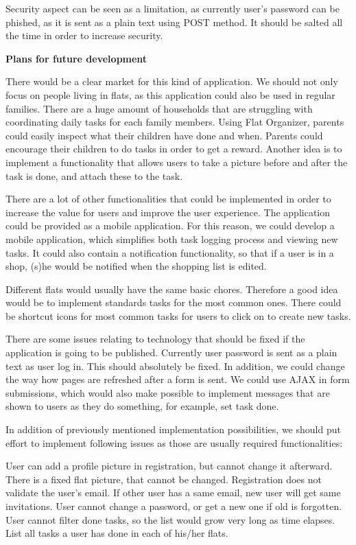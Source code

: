 \documentclass{sig-alt-release2}
\begin{document}
Security aspect can be seen as a limitation, as currently user's password can be
phished, as it is sent as a plain text using POST method. It should be salted
all the time in order to increase security.

\vspace{5 mm} \noindent \textbf{Plans for future development}

There would be a clear market for this kind of application. We should not only
focus on people living in flats, as this application could also be used in
regular families. There are a huge amount of households that are struggling with
coordinating daily tasks for each family members. Using Flat Organizer, parents
could easily inspect what their children have done and when. Parents could
encourage their children to do tasks in order to get a reward. Another idea is
to implement a functionality that allows users to take a picture before and
after the task is done, and attach these to the task.

There are a lot of other functionalities that could be implemented in order to
increase the value for users and improve the user experience. The application
could be provided as a mobile application. For this reason, we could
develop a mobile application, which simplifies both task logging process and
viewing new tasks. It could also contain a notification functionality, so that
if a user is in a shop, (s)he would be notified when the shopping list is
edited.

Different flats would usually have the same basic chores. Therefore a good idea
would be to implement standards tasks for the most common ones. There could be
shortcut icons for most common tasks for users to click on to create new tasks.

There are some issues relating to technology that should be fixed if the
application is going to be published. Currently user password is sent as a plain
text as user log in. This should absolutely be fixed. In addition, we could
change the way how pages are refreshed after a form is sent. We could use AJAX
in form submissions, which would also make possible to implement messages that
are shown to users as they do something, for example, set task done.

In addition of previously mentioned implementation possibilities, we should put
effort to implement following issues as those are usually required
functionalities:

User can add a profile picture in registration, but cannot change it afterward.
There is a fixed flat picture, that cannot be changed. Registration does not
validate the user's email. If other user has a same email, new user will get
same invitations. User cannot change a password, or get a new one if old is
forgotten. User cannot filter done tasks, so the list would grow very long as
time elapses. List all tasks a user has done in each of his/her flats.
\end{document}
